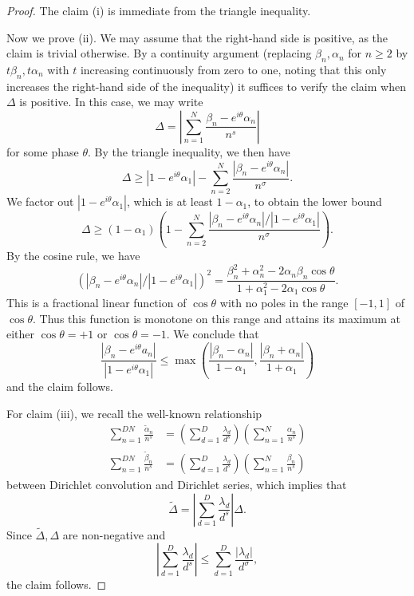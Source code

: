 \begin{proof}  The claim (i) is immediate from the triangle inequality.

Now we prove (ii).  We may assume that the right-hand side is positive, as the claim is trivial otherwise.  By a continuity argument (replacing $\beta_n,\alpha_n$ for $n \geq 2$ by $t \beta_n, t \alpha_n$ with $t$ increasing continuously from zero to one, noting that this only increases the right-hand side of the inequality) it suffices to verify the claim when $\Delta$ is positive.  In this case, we may write
$$ \Delta = \left|\sum_{n=1}^N \frac{\beta_n - e^{i\theta} \alpha_n}{n^s}\right|$$
for some phase $\theta$.   By the triangle inequality, we then have
$$ \Delta \geq |1 - e^{i\theta} \alpha_1| - \sum_{n=2}^N \frac{|\beta_n - e^{i\theta} \alpha_n|}{n^\sigma}.$$
We factor out $|1 - e^{i\theta} \alpha_1|$, which is at least $1-\alpha_1$, to obtain the lower bound
$$ \Delta \geq  (1-\alpha_1) \left(1 - \sum_{n=2}^N \frac{|\beta_n - e^{i\theta} \alpha_n| / |1 - e^{i\theta} \alpha_1|}{n^\sigma}\right).$$
By the cosine rule, we have
$$ \left(|\beta_n - e^{i\theta} \alpha_n| / |1 - e^{i\theta} \alpha_1|\right)^2 = \frac{\beta_n^2 + \alpha_n^2 - 2 \alpha_n \beta_n \cos \theta}{1 + \alpha_1^2 -2 \alpha_1 \cos \theta}.$$
This is a fractional linear function of $\cos \theta$ with no poles in the range $[-1,1]$ of $\cos \theta$.  Thus this function is monotone on this range and attains its maximum at either $\cos \theta=+1$ or $\cos \theta = -1$.  We conclude that
$$ \frac{|\beta_n - e^{i\theta} a_n|}{|1 - e^{i\theta} \alpha_1|} \leq \max\left( \frac{|\beta_n-\alpha_n|}{1-\alpha_1}, \frac{|\beta_n+\alpha_n|}{1+\alpha_1} \right)$$
and the claim follows.

For claim (iii), we recall the well-known relationship 
\begin{align*}
\sum_{n=1}^{DN} \frac{\tilde \alpha_n}{n^s} &= \left(\sum_{d=1}^{D} \frac{\lambda_d}{d^s}\right) \left(\sum_{n=1}^{N} \frac{\alpha_n}{n^s}\right)\\
\sum_{n=1}^{DN} \frac{\tilde \beta_n}{n^s} &= \left(\sum_{d=1}^{D} \frac{\lambda_d}{d^s}\right) \left(\sum_{n=1}^{N} \frac{\beta_n}{n^s}\right)
\end{align*}
between Dirichlet convolution and Dirichlet series, which implies that
$$ \tilde \Delta = \left|\sum_{d=1}^{D} \frac{\lambda_d}{d^s}\right| \Delta.$$
Since $\tilde \Delta,\Delta$ are non-negative and 
$$ \left|\sum_{d=1}^{D} \frac{\lambda_d}{d^s}\right| \leq \sum_{d=1}^D \frac{|\lambda_d|}{d^\sigma},$$
the claim follows.
\end{proof}

